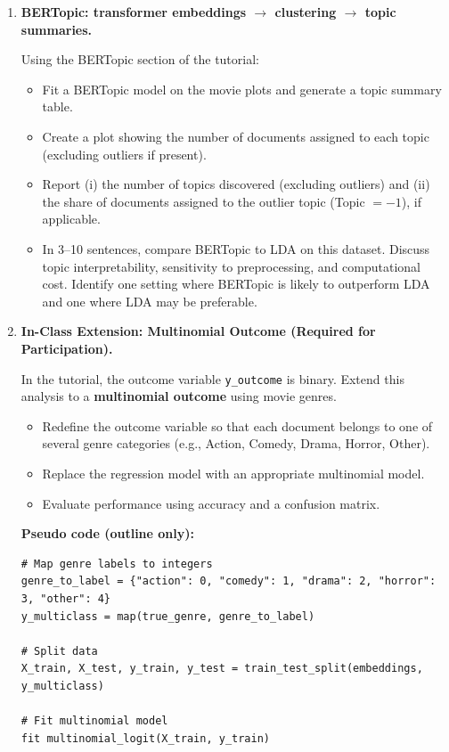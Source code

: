 \documentclass[11pt]{article}
\begin{document}
\begin{enumerate}
\item \textbf{BERTopic: transformer embeddings $\rightarrow$ clustering $\rightarrow$ topic summaries.}

Using the BERTopic section of the tutorial:

\begin{itemize}
  \item Fit a BERTopic model on the movie plots and generate a topic summary table.
  \item Create a plot showing the number of documents assigned to each topic (excluding outliers if present).
  \item Report (i) the number of topics discovered (excluding outliers) and (ii) the share of documents assigned to the outlier topic (Topic $=-1$), if applicable.
  \item In 3--10 sentences, compare BERTopic to LDA on this dataset. Discuss topic interpretability, sensitivity to preprocessing, and computational cost. Identify one setting where BERTopic is likely to outperform LDA and one where LDA may be preferable.
\end{itemize}

\item \textbf{In-Class Extension: Multinomial Outcome (Required for Participation).}

In the tutorial, the outcome variable \texttt{y\_outcome} is binary. Extend this analysis to a \textbf{multinomial outcome} using movie genres.

\begin{itemize}
  \item Redefine the outcome variable so that each document belongs to one of several genre categories (e.g., Action, Comedy, Drama, Horror, Other).
  \item Replace the regression model with an appropriate multinomial model.
  \item Evaluate performance using accuracy and a confusion matrix.
\end{itemize}

\noindent \textbf{Pseudo code (outline only):}

\begin{verbatim}
# Map genre labels to integers
genre_to_label = {"action": 0, "comedy": 1, "drama": 2, "horror": 3, "other": 4}
y_multiclass = map(true_genre, genre_to_label)

# Split data
X_train, X_test, y_train, y_test = train_test_split(embeddings, y_multiclass)

# Fit multinomial model
fit multinomial_logit(X_train, y_train)


\end{verbatim}
\end{enumerate}
\end{document}
